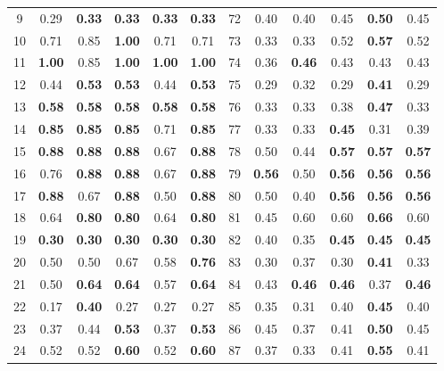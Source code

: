 \documentclass{article}
\begin{document}
{\begin{longtable}{cccccc@{\qquad}cccccc}
9 & 0.29 & \textbf{0.33} & \textbf{0.33} & \textbf{0.33} & \textbf{0.33} & 72 & 0.40 & 0.40 & 0.45 & \textbf{0.50} & 0.45 \\
10 & 0.71 & 0.85 & \textbf{1.00} & 0.71 & 0.71 & 73 & 0.33 & 0.33 & 0.52 & \textbf{0.57} & 0.52 \\
11 & \textbf{1.00} & 0.85 & \textbf{1.00} & \textbf{1.00} & \textbf{1.00} & 74 & 0.36 & \textbf{0.46} & 0.43 & 0.43 & 0.43 \\
12 & 0.44 & \textbf{0.53} & \textbf{0.53} & 0.44 & \textbf{0.53} & 75 & 0.29 & 0.32 & 0.29 & \textbf{0.41} & 0.29 \\
13 & \textbf{0.58} & \textbf{0.58} & \textbf{0.58} & \textbf{0.58} & \textbf{0.58} & 76 & 0.33 & 0.33 & 0.38 & \textbf{0.47} & 0.33 \\
14 & \textbf{0.85} & \textbf{0.85} & \textbf{0.85} & 0.71 & \textbf{0.85} & 77 & 0.33 & 0.33 & \textbf{0.45} & 0.31 & 0.39 \\
15 & \textbf{0.88} & \textbf{0.88} & \textbf{0.88} & 0.67 & \textbf{0.88} & 78 & 0.50 & 0.44 & \textbf{0.57} & \textbf{0.57} & \textbf{0.57} \\
16 & 0.76 & \textbf{0.88} & \textbf{0.88} & 0.67 & \textbf{0.88} & 79 & \textbf{0.56} & 0.50 & \textbf{0.56} & \textbf{0.56} & \textbf{0.56} \\
17 & \textbf{0.88} & 0.67 & \textbf{0.88} & 0.50 & \textbf{0.88} & 80 & 0.50 & 0.40 & \textbf{0.56} & \textbf{0.56} & \textbf{0.56} \\
18 & 0.64 & \textbf{0.80} & \textbf{0.80} & 0.64 & \textbf{0.80} & 81 & 0.45 & 0.60 & 0.60 & \textbf{0.66} & 0.60 \\
19 & \textbf{0.30} & \textbf{0.30} & \textbf{0.30} & \textbf{0.30} & \textbf{0.30} & 82 & 0.40 & 0.35 & \textbf{0.45} & \textbf{0.45} & \textbf{0.45} \\
20 & 0.50 & 0.50 & 0.67 & 0.58 & \textbf{0.76} & 83 & 0.30 & 0.37 & 0.30 & \textbf{0.41} & 0.33 \\
21 & 0.50 & \textbf{0.64} & \textbf{0.64} & 0.57 & \textbf{0.64} & 84 & 0.43 & \textbf{0.46} & \textbf{0.46} & 0.37 & \textbf{0.46} \\
22 & 0.17 & \textbf{0.40} & 0.27 & 0.27 & 0.27 & 85 & 0.35 & 0.31 & 0.40 & \textbf{0.45} & 0.40 \\
23 & 0.37 & 0.44 & \textbf{0.53} & 0.37 & \textbf{0.53} & 86 & 0.45 & 0.37 & 0.41 & \textbf{0.50} & 0.45 \\
24 & 0.52 & 0.52 & \textbf{0.60} & 0.52 & \textbf{0.60} & 87 & 0.37 & 0.33 & 0.41 & \textbf{0.55} & 0.41 \\

\end{longtable}}
\end{document}
